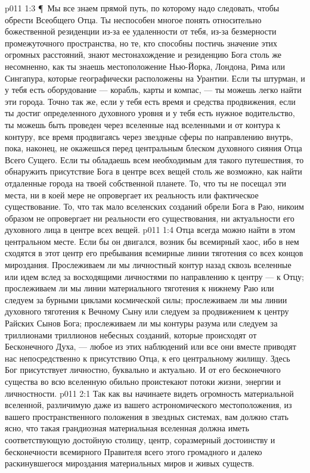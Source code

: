 \vs p011 1:3 \P\ Мы все знаем прямой путь, по которому надо следовать, чтобы обрести Всеобщего Отца. Ты неспособен многое понять относительно божественной резиденции из\hyp{}за ее удаленности от тебя, из\hyp{}за безмерности промежуточного пространства, но те, кто способны постичь значение этих огромных расстояний, знают местонахождение и резиденцию Бога столь же несомненно, как ты знаешь местоположение Нью\hyp{}Йорка, Лондона, Рима или Сингапура, которые географически расположены на Урантии. Если ты штурман, и у тебя есть оборудование --- корабль, карты и компас, --- ты можешь легко найти эти города. Точно так же, если у тебя есть время и средства продвижения, если ты достиг определенного духовного уровня и у тебя есть нужное водительство, ты можешь быть проведен через вселенные над вселенными и от контура к контуру, все время продвигаясь через звездные сферы по направлению внутрь, пока, наконец, не окажешься перед центральным блеском духовного сияния Отца Всего Сущего. Если ты обладаешь всем необходимым для такого путешествия, то обнаружить присутствие Бога в центре всех вещей столь же возможно, как найти отдаленные города на твоей собственной планете. То, что ты не посещал эти места, ни в коей мере не опровергает их реальность или фактическое существование. То, что так мало вселенских созданий обрели Бога в Раю, никоим образом не опровергает ни реальности его существования, ни актуальности его духовного лица в центре всех вещей.
\vs p011 1:4 Отца всегда можно найти в этом центральном месте. Если бы он двигался, возник бы всемирный хаос, ибо в нем сходятся в этот центр его пребывания всемирные линии тяготения со всех концов мироздания. Прослеживаем ли мы личностный контур назад сквозь вселенные или идем вслед за восходящими личностями по направлению к центру --- к Отцу; прослеживаем ли мы линии материального тяготения к нижнему Раю или следуем за бурными циклами космической силы; прослеживаем ли мы линии духовного тяготения к Вечному Сыну или следуем за продвижением к центру Райских Сынов Бога; прослеживаем ли мы контуры разума или следуем за триллионами триллионов небесных созданий, которые происходят от Бесконечного Духа, --- любое из этих наблюдений или все они вместе приводят нас непосредственно к присутствию Отца, к его центральному жилищу. Здесь Бог присутствует личностно, буквально и актуально. И от его бесконечного существа во всю вселенную обильно проистекают потоки жизни, энергии и личностности.
\vs p011 2:1 Так как вы начинаете видеть огромность материальной вселенной, различимую даже из вашего астрономического местоположения, из вашего пространственного положения в звездных системах, вам должно стать ясно, что такая грандиозная материальная вселенная должна иметь соответствующую достойную столицу, центр, соразмерный достоинству и бесконечности всемирного Правителя всего этого громадного и далеко раскинувшегося мироздания материальных миров и живых существ.
